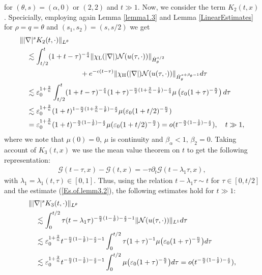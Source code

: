 \documentclass[11pt,reqno]{amsart}
\begin{document}
for $(\theta, s) = (\alpha, 0)$ or $(2,2)$ and $ t \gg 1$. Now, we consider the term $K_2(t,x)$. Specicially, employing again Lemma \ref{lemma1.3} and Lemma \ref{LinearEstimates} for $\rho =q =\theta$ and $(s_1, s_2) = (s, s/2)$ we get
\begin{align}
    &\||\nabla|^s K_2(t,\cdot)\|_{L^\theta}\notag\\ 
    &\quad\lesssim \int_{t/2}^t (1+t-\tau)^{-\frac{s}{4}}\|\chi_{\rm L}(|\nabla|)\mathcal{N}(u(\tau,\cdot))\|_{\dot{H}^{s/2}_\theta} \notag\\
    &\hspace{3cm}+ e^{-c(t-\tau)} \|\chi_{\rm H}(|\nabla|)\mathcal{N}(u(\tau,\cdot))\|_{\dot{H}^{s+\beta_\theta-1}_{\theta}} d\tau\notag\\
    &\quad\lesssim  \varepsilon_0^{1+\frac{2}{n}}\int_{t/2}^t (1+t-\tau)^{-\frac{s}{4}}(1+\tau)^{-\frac{n}{2}(1+\frac{2}{n}-\frac{1}{\theta})-\frac{s}{4}} \mu\left(\varepsilon_0 (1+\tau)^{-\frac{n}{2}}\right) d\tau\notag\\
    &\quad\lesssim \varepsilon_0^{1+\frac{2}{n}} (1+t)^{1-\frac{n}{2}(1+\frac{2}{n}-\frac{1}{\theta})-\frac{s}{2}} \mu(\varepsilon_0 (1+t/2)^{-\frac{n}{2}}) \notag\\
    &\quad= \varepsilon_0^{1+\frac{2}{n}} (1+t)^{-\frac{n}{2}(1-\frac{1}{\theta})-\frac{s}{2}} \mu(\varepsilon_0 (1+t/2)^{-\frac{n}{2}}) = o(t^{-\frac{n}{2}(1-\frac{1}{\theta})-\frac{s}{2}}), \quad t \gg 1,\label{Relation2}
\end{align}
 where we note that $\mu(0) = 0$, $\mu$ is continuity and $\beta_\alpha < 1, \, \beta_2 = 0$. Taking account of $K_3(t,x)$ we use the mean value theorem on $t$ to get the following representation:
\begin{align*}
    \mathcal{G}(t-\tau,x) - \mathcal{G}(t,x) = -\tau \partial_t\mathcal{G}(t- \lambda_1 \tau, x),
\end{align*}
with $\lambda_1=\lambda_1(t,\tau)\in [0,1]$. Thus, using the relation $t -\lambda_1 \tau \sim t$ for $\tau \in [0, t/2]$ and the estimate (\ref{Es.of.lemm3.2}),  the  following estimates hold for $t \gg 1$:
\begin{align}
    &\||\nabla|^s K_3(t,\cdot)\|_{L^\theta}\notag\\ 
    &\quad\lesssim \int_0^{t/2} \tau(t- \lambda_1\tau)^{-\frac{n}{2}(1-\frac{1}{\theta})-\frac{s}{2}-1} \|\mathcal{N}(u(\tau,\cdot))\|_{L^1} d\tau\notag\\
    &\quad\lesssim \varepsilon_0^{1+\frac{2}{n}}t^{-\frac{n}{2}(1-\frac{1}{\theta})-\frac{s}{2}-1} \int_0^{t/2} \tau (1+\tau)^{-1} \mu\big(\varepsilon_0 (1+\tau)^{-\frac{n}{2}} \big) d\tau\notag\\
    &\quad\lesssim \varepsilon_0^{1+\frac{2}{n}}t^{-\frac{n}{2}(1-\frac{1}{\theta})-\frac{s}{2}-1} \int_0^{t/2} \mu\big(\varepsilon_0 (1+\tau)^{-\frac{n}{2}} \big) d\tau = o(t^{-\frac{n}{2}(1-\frac{1}{\theta})-\frac{s}{2}}),  \label{Relation3}
\end{align}
\end{document}

